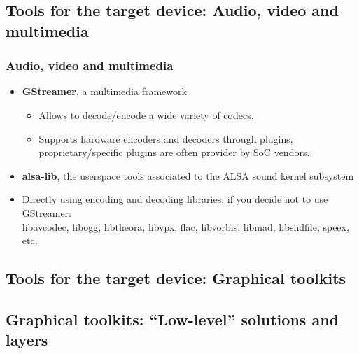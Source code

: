 \subsection[Multimedia tools]{Tools for the target device: Audio,
  video and multimedia}

\begin{frame}
  \frametitle{Audio, video and multimedia}
  \begin{itemize}
  \item {\bf GStreamer}, a multimedia framework
    \begin{itemize}
    \item Allows to decode/encode a wide variety of codecs.
    \item Supports hardware encoders and decoders through plugins,
      proprietary/specific plugins are often provider by SoC vendors.
    \end{itemize}
  \item {\bf alsa-lib}, the userspace tools associated to the ALSA sound
    kernel subsystem
  \item Directly using encoding and decoding libraries, if you decide
    not to use GStreamer:\\
    libavcodec, libogg, libtheora, libvpx, flac, libvorbis, libmad,
    libsndfile, speex, etc.
  \end{itemize}
\end{frame}

\subsection[Graphical toolkits]{Tools for the target device: Graphical
  toolkits}

\subsection[Low-level toolkits]{Graphical toolkits:
``Low-level'' solutions and layers}

